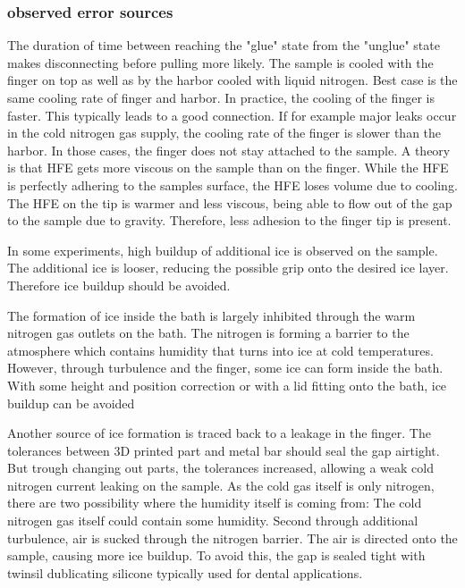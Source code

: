 \subsubsection{observed error sources}

The duration of time between reaching the "glue" state from the "unglue" state makes disconnecting before pulling more likely. The sample is cooled with the finger on top as well as by the harbor cooled with liquid nitrogen. Best case is the same cooling rate of finger and harbor. In practice, the cooling of the finger is faster. This typically leads to a good connection. If for example major leaks occur in the cold nitrogen gas supply, the cooling rate of the finger is slower than the harbor. In those cases, the finger does not stay attached to the sample. A theory is that HFE gets more viscous on the sample than on the finger. While the HFE is perfectly adhering to the samples surface, the HFE loses volume due to cooling. The HFE on the tip is warmer and less viscous, being able to flow out of the gap to the sample due to gravity. Therefore, less adhesion to the finger tip is present.

In some experiments, high buildup of additional ice is observed on the sample. The additional ice is looser, reducing the possible grip onto the desired ice layer. Therefore ice buildup should be avoided.

The formation of ice inside the bath is largely inhibited through the warm nitrogen gas outlets on the bath. The nitrogen is forming a barrier to the atmosphere which contains humidity that turns into ice at cold temperatures. However, through turbulence and the finger, some ice can form inside the bath. With some height and position correction or with a lid fitting onto the bath, ice buildup can be avoided

Another source of ice formation is traced back to a leakage in the finger. The tolerances between 3D printed part and metal bar should seal the gap airtight. But trough changing out parts, the tolerances increased, allowing a weak cold nitrogen current leaking on the sample. As the cold gas itself is only nitrogen, there are two possibility where the humidity itself is coming from: The cold nitrogen gas itself could contain some humidity. Second through additional turbulence, air is sucked through the nitrogen barrier. The air is directed onto the sample, causing more ice buildup. To avoid this, the gap is sealed tight with twinsil dublicating silicone typically used for dental applications.

